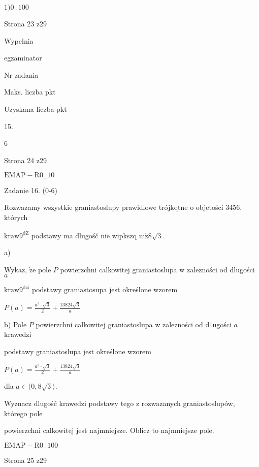 \documentclass[a4paper,12pt]{article}
\begin{document}
$1)0_{-}100$

Strona 23 z29





Wypelnia

egzaminator

Nr zadania

Maks. liczba pkt

Uzyskana liczba pkt

15.

6

Strona 24 z29

$\mathrm{E}\mathrm{M}\mathrm{A}\mathrm{P}-\mathrm{R}0_{-}10$





Zadanie 16. (0-6)

Rozwazamy wszystkie graniastoslupy prawidlowe trójkqtne o objetości 3456, których

$\mathrm{k}\mathrm{r}\mathrm{a}\mathrm{w}9^{\mathrm{d}\acute{\mathrm{Z}}}$ podstawy ma dlugośč nie wipkszq $\mathrm{n}\mathrm{i}\dot{\mathrm{z}} 8\sqrt{3}.$

a)

Wykaz, $\dot{\mathrm{z}}\mathrm{e}$ pole $P$ powierzchni calkowitej graniastoslupa w zalezności od dlugości $a$

$\mathrm{k}\mathrm{r}\mathrm{a}\mathrm{w}9^{\mathrm{d}\mathrm{z}\mathrm{i}}$ podstawy $\mathrm{g}\mathrm{r}\mathrm{a}\mathrm{n}\mathrm{i}\mathrm{a}\mathrm{s}\mathrm{t}\mathrm{o}\mathrm{s}\mathrm{u}\mathrm{p}\mathrm{a}$ jest określone wzorem

$P(a)=\displaystyle \frac{a^{2}\cdot\sqrt{3}}{2}+\frac{13824\sqrt{3}}{a}$

b) Pole $P$ powierzchni calkowitej graniastoslupa w zalezności od d$\dagger$ugości $a$ krawedzi

podstawy graniastoslupa jest określone wzorem

$P(a)=\displaystyle \frac{a^{2}\cdot\sqrt{3}}{2}+\frac{13824\sqrt{3}}{a}$

dla $a\in(0,8\sqrt{3}\rangle.$

Wyznacz dlugość krawedzi podstawy tego z rozwazanych graniastoslupów, którego pole

powierzchni calkowitej jest najmniejsze. Oblicz to najmniejsze pole.

$\mathrm{E}\mathrm{M}\mathrm{A}\mathrm{P}-\mathrm{R}0_{-}100$

Strona 25 z29
\end{document}
